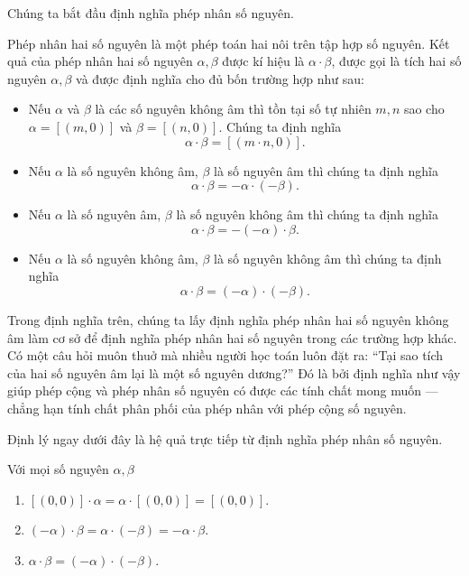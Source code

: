 Chúng ta bắt đầu định nghĩa phép nhân số nguyên.
\begin{definition}
    Phép nhân hai số nguyên là một phép toán hai nôi trên tập hợp số nguyên. Kết quả của phép nhân hai số nguyên $\alpha, \beta$ được kí hiệu là $\alpha\cdot\beta$, được gọi là tích hai số nguyên $\alpha, \beta$ và được định nghĩa cho đủ bốn trường hợp như sau:
    \begin{itemize}[itemsep=0pt]
        \item Nếu $\alpha$ và $\beta$ là các số nguyên không âm thì tồn tại số tự nhiên $m, n$ sao cho $\alpha = [(m, 0)]$ và $\beta = [(n, 0)]$. Chúng ta định nghĩa
              \[
                  \alpha\cdot\beta = [(m\cdot n, 0)].
              \]
        \item Nếu $\alpha$ là số nguyên không âm, $\beta$ là số nguyên âm thì chúng ta định nghĩa
              \[
                  \alpha\cdot\beta = -\alpha\cdot(-\beta).
              \]
        \item Nếu $\alpha$ là số nguyên âm, $\beta$ là số nguyên không âm thì chúng ta định nghĩa
              \[
                  \alpha\cdot\beta = -(-\alpha)\cdot \beta.
              \]
        \item Nếu $\alpha$ là số nguyên không âm, $\beta$ là số nguyên không âm thì chúng ta định nghĩa
              \[
                  \alpha\cdot\beta = (-\alpha)\cdot(-\beta).
              \]
    \end{itemize}
\end{definition}

Trong định nghĩa trên, chúng ta lấy định nghĩa phép nhân hai số nguyên không âm làm cơ sở để định nghĩa phép nhân hai số nguyên trong các trường hợp khác. Có một câu hỏi muôn thuở mà nhiều người học toán luôn đặt ra: ``Tại sao tích của hai số nguyên âm lại là một số nguyên dương?'' Đó là bởi định nghĩa như vậy giúp phép cộng và phép nhân số nguyên có được các tính chất mong muốn --- chẳng hạn tính chất phân phối của phép nhân với phép cộng số nguyên.

Định lý ngay dưới đây là hệ quả trực tiếp từ định nghĩa phép nhân số nguyên.
\begin{theorem}
    Với mọi số nguyên $\alpha, \beta$
    \begin{enumerate}[label={(\roman*)}]
        \item $[(0, 0)]\cdot\alpha = \alpha\cdot[(0,0)] = [(0,0)]$.
        \item $(-\alpha)\cdot\beta = \alpha\cdot(-\beta) = -\alpha\cdot\beta$.
        \item $\alpha\cdot\beta = (-\alpha)\cdot(-\beta)$.
    \end{enumerate}
\end{theorem}


